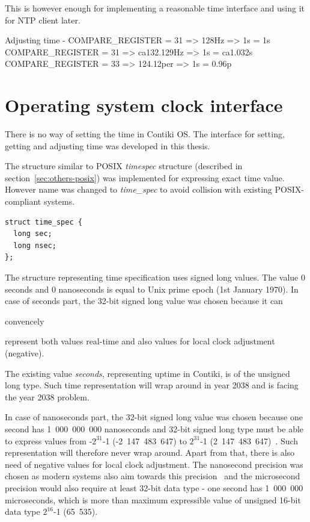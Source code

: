 
This is however enough for implementing a reasonable time interface and using it for NTP client later.



Adjusting time - COMPARE\_REGISTER = 31 => 128Hz => 1s = 1s
COMPARE\_REGISTER = 31 => ca132.129Hz => 1s = ca1.032s
COMPARE\_REGISTER = 33 => 124.12per => 1s = 0.96p


\section{Operating system clock interface}
There is no way of setting the time in Contiki OS.
The interface for setting, getting and adjusting time was developed in this thesis.

The structure similar to POSIX {\it{timespec}} structure (described in section~\ref{sec:others-posix})
was implemented for expressing exact time value.
However name was changed to {\it{time\_spec}} to avoid collision with existing POSIX-compliant systems.
\begin{lstlisting}
struct time_spec {
  long sec;
  long nsec;
};
\end{lstlisting}
The structure representing time specification uses signed long values.
The value 0 seconds and 0 nanoseconds is equal to Unix prime epoch (1st January 1970).
In case of seconds part, the 32-bit signed long value was chosen because
it can

convencely

represent both values real-time and also values for local clock adjustment (negative).

The existing value {\it{seconds}}, representing uptime in Contiki, is of the unsigned long type.
Such time representation will wrap around in year 2038 and is facing the year 2038 problem.

In case of nanoseconds part, the 32-bit signed long value was chosen because
one second has 1~000~000~000 nanoseconds and
32-bit signed long type must be able to express values from -$2^{31}$-1 (-2~147~483~647)
to $2^{31}$-1 (2~147~483~647)~\cite{c99}.
Such representation will therefore never wrap around.
Apart from that, there is also need of negative values for local clock adjustment.
The nanosecond precision was chosen as modern systems also aim towards this
precision~\cite{posix,ntp-precision} and
the microsecond precision would also require at least 32-bit data type -
one second has 1~000~000 microseconds, which is more than maximum expressible value of unsigned 16-bit
data type $2^{16}$-1 (65~535).

